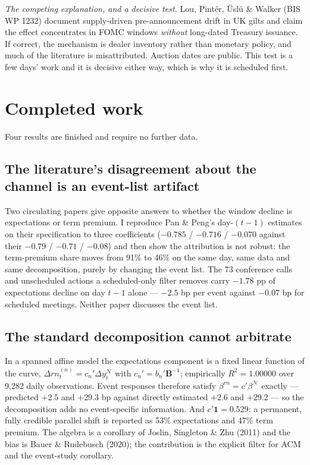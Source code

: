 \documentclass[11pt]{article}
\begin{document}
\emph{The competing explanation, and a decisive test.} Lou, Pintér, Üslü \& Walker (BIS WP
1232) document supply-driven pre-announcement drift in UK gilts and claim the effect
concentrates in FOMC windows \emph{without} long-dated Treasury issuance. If correct, the
mechanism is dealer inventory rather than monetary policy, and much of the literature is
misattributed. Auction dates are public. This test is a few days' work and it is decisive
either way, which is why it is scheduled first.

\section{Completed work}

Four results are finished and require no further data.

\subsection{The literature's disagreement about the channel is an event-list artifact}

Two circulating papers give opposite answers to whether the window decline is expectations or
term premium. I reproduce Pan \& Peng's day-$(t-1)$ estimates on their specification to three
coefficients ($-0.785$ / $-0.716$ / $-0.070$ against their $-0.79$ / $-0.71$ / $-0.08$) and
then show the attribution is not robust: the term-premium share moves from 91\% to 46\% on the
same day, same data and same decomposition, purely by changing the event list. The 73
conference calls and unscheduled actions a scheduled-only filter removes carry $-1.78$ pp of
expectations decline on day $t-1$ alone --- $-2.5$ bp per event against $-0.07$ bp for
scheduled meetings. Neither paper discusses the event list.

\subsection{The standard decomposition cannot arbitrate}

In a spanned affine model the expectations component is a fixed linear function of the curve,
$\Delta rn^{(n)}_t = c_n' \Delta y^{\mathcal N}_t$ with $c_n' = b_n' \mathbf{B}^{-1}$;
empirically $R^2 = 1.00000$ over 9{,}282 daily observations. Event responses therefore satisfy
$\beta^{rn} = c'\beta^{\mathcal N}$ exactly --- predicted $+2.5$ and $+29.3$ bp against directly
estimated $+2.6$ and $+29.2$ --- so the decomposition adds no event-specific information. And
$c'\mathbf{1} = 0.529$: a permanent, fully credible parallel shift is reported as 53\%
expectations and 47\% term premium. The algebra is a corollary of Joslin, Singleton \& Zhu
(2011) and the bias is Bauer \& Rudebusch (2020); the contribution is the explicit filter for
ACM and the event-study corollary.
\end{document}
